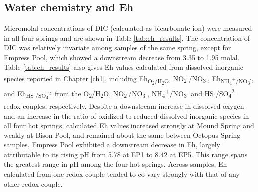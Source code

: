 \subsection{Water chemistry and Eh}

Micromolal concentrations of DIC (calculated as bicarbonate ion) were measured in all four springs and are shown in Table \ref{tab:eh_results}. The concentration of DIC was relatively invariate among samples of the same spring, except for Empress Pool, which showed a downstream decrease from 3.35 to 1.95 molal. Table \ref{tab:eh_results} also gives Eh values calculated from dissolved inorganic species reported in Chapter \ref{ch1}, including Eh\textsubscript{O\textsubscript{2}/H\textsubscript{2}O},
NO\textsubscript{2}\textsuperscript{-}/NO\textsubscript{3}\textsuperscript{-}, Eh\textsubscript{NH\textsubscript{4}\textsuperscript{+}/NO\textsubscript{3}\textsuperscript{-}}, and Eh\textsubscript{HS\textsuperscript{-}/SO\textsubscript{4}\textsuperscript{2-}} from the O\textsubscript{2}/H\textsubscript{2}O, NO\textsubscript{2}\textsuperscript{-}/NO\textsubscript{3}\textsuperscript{-}, NH\textsubscript{4}\textsuperscript{+}/NO\textsubscript{3}\textsuperscript{-} and HS\textsuperscript{-}/SO\textsubscript{4}\textsuperscript{2-} redox couples, respectively. Despite a downstream increase in dissolved oxygen and an increase in the ratio of oxidized to reduced dissolved inorganic species in all four hot springs, calculated Eh values increased strongly at Mound Spring and weakly at Bison Pool, and remained about the same between Octopus Spring samples. Empress Pool exhibited a downstream decrease in Eh, largely attributable to its rising pH from 5.78 at EP1 to 8.42 at EP5. This range spans the greatest range in pH among the four hot springs. Across samples, Eh calculated from one redox couple tended to co-vary strongly with that of any other redox couple.






